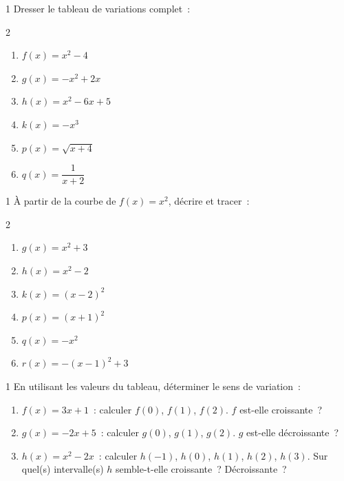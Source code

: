 \begin{exo}{1}
Dresser le tableau de variations complet~:
\begin{multicols}{2}
\begin{enumerate}
  \item $f(x) = x^2 - 4$
  \item $g(x) = -x^2 + 2x$
  \item $h(x) = x^2 - 6x + 5$
  \item $k(x) = -x^3$
  \item $p(x) = \sqrt{x+4}$
  \item $q(x) = \dfrac{1}{x+2}$
\end{enumerate}
\end{multicols}
\end{exo}

\begin{exo}{1}
\`A partir de la courbe de $f(x)=x^2$, d\'ecrire et tracer~:
\begin{multicols}{2}
\begin{enumerate}
  \item $g(x) = x^2 + 3$
  \item $h(x) = x^2 - 2$
  \item $k(x) = (x-2)^2$
  \item $p(x) = (x+1)^2$
  \item $q(x) = -x^2$
  \item $r(x) = -(x-1)^2 + 3$
\end{enumerate}
\end{multicols}
\end{exo}

\begin{exo}{1}
En utilisant les valeurs du tableau, d\'eterminer le sens de variation~:
\begin{enumerate}
  \item $f(x)=3x+1$~: calculer $f(0)$, $f(1)$, $f(2)$. $f$ est-elle croissante~?
  \item $g(x)=-2x+5$~: calculer $g(0)$, $g(1)$, $g(2)$.
        $g$ est-elle d\'ecroissante~?
  \item $h(x)=x^2-2x$~: calculer $h(-1)$, $h(0)$, $h(1)$, $h(2)$, $h(3)$.
        Sur quel(s) intervalle(s) $h$ semble-t-elle croissante~? D\'ecroissante~?
\end{enumerate}
\end{exo}

